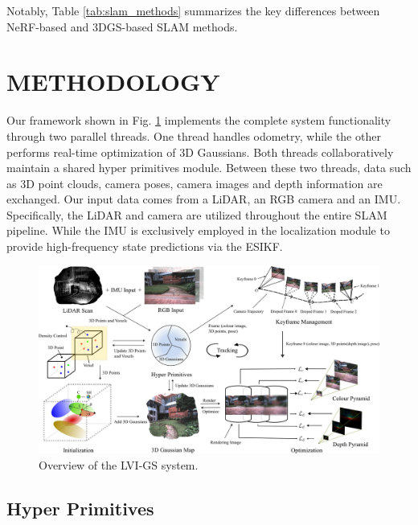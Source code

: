\documentclass[lettersize,journal]{IEEEtran}
\begin{document}
Notably, Table \ref{tab:slam_methods} summarizes the key differences between NeRF-based and 3DGS-based SLAM methods.

\section{METHODOLOGY}
Our framework shown in Fig. \ref{pipeline} implements the complete system functionality through two parallel threads. One thread handles odometry, while the other performs real-time optimization of 3D Gaussians. Both threads collaboratively maintain a shared hyper primitives module. Between these two threads, data such as 3D point clouds, camera poses, camera images and depth information are exchanged. Our input data comes from a LiDAR, an RGB camera and an IMU. Specifically, the LiDAR and camera are utilized throughout the entire SLAM pipeline. While the IMU is exclusively employed in the localization module to provide high-frequency state predictions via the ESIKF.
\begin{figure}[htb]  %
        \captionsetup{justification=justified, labelsep=colon}%
        \centering
        \includegraphics[width=2.0\columnwidth]{image/pipeline_revise.jpg}
        \caption{Overview of the LVI-GS system.
        }  %
        \label{pipeline}
\end{figure}%

\subsection{Hyper Primitives}
\end{document}
